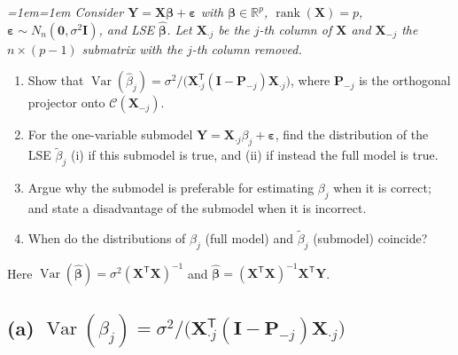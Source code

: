 \documentclass[11pt]{article}
\DeclareMathOperator{\rank}{rank}
\DeclareMathOperator{\Var}{Var}
\newcommand{\Cs}{\mathcal{C}}
\newcommand{\R}{\mathbb{R}}
\newcommand{\bX}{\mathbf{X}}
\newcommand{\bY}{\mathbf{Y}}
\newcommand{\bI}{\mathbf{I}}
\newcommand{\bP}{\mathbf{P}}
\newcommand{\bzero}{\mathbf{0}}
\newcommand{\bbeta}{\bm{\beta}}
\newcommand{\beps}{\bm{\varepsilon}}
\newcommand{\T}{^{\mathsf{T}}}
\newcommand{\inv}{^{-1}}
\newcommand{\bhat}[1]{\widehat{#1}}
\theoremstyle{remark}
\newenvironment{question}%
  {\smallskip\itshape\leftskip=1em\rightskip=1em\relax}%
  {\par\smallskip\noindent\hrulefill\par}
\begin{document}
\begin{question}
Consider $\bY=\bX\bbeta+\beps$ with $\bbeta\in\R^p$, $\rank(\bX)=p$, $\beps\sim N_n(\bzero,\sigma^2\bI)$, and
LSE $\bhat{\bbeta}$. Let $\bX_{\cdot j}$ be the $j$-th column of $\bX$ and $\bX_{-j}$ the $n\times(p-1)$
submatrix with the $j$-th column removed.
\begin{enumerate}[label=(\alph*),leftmargin=2.2em,itemsep=1pt]
\item Show that $\Var(\bhat\beta_j)=\sigma^2\big/\big(\bX_{\cdot j}\T(\bI-\bP_{-j})\bX_{\cdot j}\big)$, where
$\bP_{-j}$ is the orthogonal projector onto $\Cs(\bX_{-j})$.
\item For the one-variable submodel $\bY=\bX_{\cdot j}\beta_j+\beps$, find the distribution of the LSE
$\widetilde\beta_j$ (i) if this submodel is true, and (ii) if instead the full model is true.
\item Argue why the submodel is preferable for estimating $\beta_j$ when it is correct; and state a
disadvantage of the submodel when it is incorrect.
\item When do the distributions of $\bhat\beta_j$ (full model) and $\widetilde\beta_j$ (submodel) coincide?
\end{enumerate}
\end{question}

Here $\Var(\bhat{\bbeta})=\sigma^2(\bX\T\bX)\inv$ and $\bhat{\bbeta}=(\bX\T\bX)\inv\bX\T\bY$.

\subsection*{(a) $\Var(\bhat\beta_j)=\sigma^2/\big(\bX_{\cdot j}\T(\bI-\bP_{-j})\bX_{\cdot j}\big)$}
\end{document}
